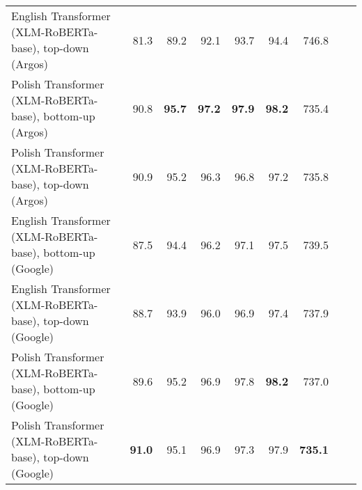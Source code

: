 \begin{table}[ht!]
{\begin{tabular}{lrrrrrrrr}
  English Transformer (XLM-RoBERTa-base), top-down (Argos) & 81.3 & 89.2 & 92.1 & 93.7 & 94.4 & 746.8 \\ 
  Polish Transformer (XLM-RoBERTa-base), bottom-up (Argos) & 90.8 & \textbf{95.7} & \textbf{97.2} & \textbf{97.9} & \textbf{98.2} & 735.4 \\ 
  Polish Transformer (XLM-RoBERTa-base), top-down (Argos) & 90.9 & 95.2 & 96.3 & 96.8 & 97.2 & 735.8 \\ 
  English Transformer (XLM-RoBERTa-base), bottom-up (Google) & 87.5 & 94.4 & 96.2 & 97.1 & 97.5 & 739.5 \\ 
  English Transformer (XLM-RoBERTa-base), top-down (Google) & 88.7 & 93.9 & 96.0 & 96.9 & 97.4 & 737.9 \\ 
  Polish Transformer (XLM-RoBERTa-base), bottom-up (Google) & 89.6 & 95.2 & 96.9 & 97.8 & \textbf{98.2} & 737.0 \\ 
  Polish Transformer (XLM-RoBERTa-base), top-down (Google) & \textbf{91.0} & 95.1 & 96.9 & 97.3 & 97.9 & \textbf{735.1} \\ 
   \hline
\end{tabular}
}
\end{table}




